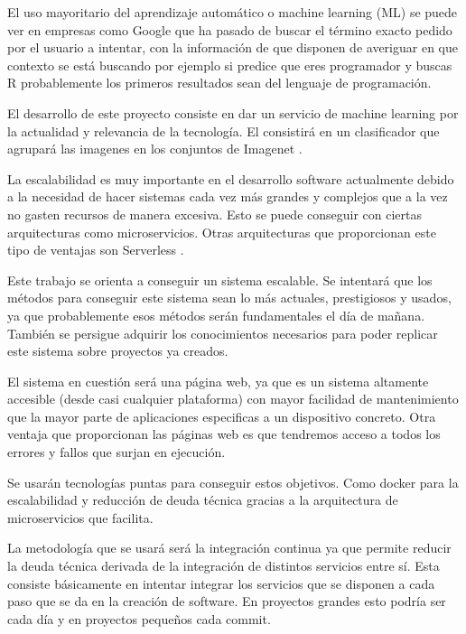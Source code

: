 

El uso mayoritario del aprendizaje automático o machine learning (ML) se puede ver en empresas como Google que ha pasado de buscar el término exacto pedido por el usuario a intentar, con la información de que disponen de averiguar en que contexto se está buscando por ejemplo si predice que eres programador y buscas R probablemente los primeros resultados sean del lenguaje de programación.

El desarrollo de este proyecto consiste en dar un servicio de machine learning por la actualidad y relevancia de la tecnología. El consistirá en un clasificador que agrupará las imagenes en los conjuntos de Imagenet \cite{imnet}.

La escalabilidad es muy importante en el desarrollo software actualmente debido a la necesidad de hacer sistemas cada vez más grandes y complejos que a la vez no gasten recursos de manera excesiva. Esto se puede conseguir con ciertas arquitecturas como microservicios. Otras arquitecturas que proporcionan este tipo de ventajas son Serverless \cite{svlops} \cite{svless}.

Este trabajo se orienta a conseguir un sistema escalable. Se intentará que los métodos para conseguir este sistema sean lo más actuales, prestigiosos y usados, ya que probablemente esos métodos serán fundamentales el día de mañana. También se persigue adquirir los conocimientos necesarios para poder replicar este sistema sobre proyectos ya creados.

El sistema en cuestión será una página web, ya que es un sistema altamente accesible (desde casi cualquier plataforma) con mayor facilidad de mantenimiento que la mayor parte de aplicaciones especificas a un dispositivo concreto. Otra ventaja que proporcionan las páginas web es que tendremos acceso a todos los errores y fallos que surjan en ejecución.

Se usarán tecnologías puntas para conseguir estos objetivos. Como docker para la escalabilidad y reducción de deuda técnica gracias a la arquitectura de microservicios que facilita.

La metodología que se usará será la integración continua ya que permite reducir la deuda técnica derivada de la integración de distintos servicios entre sí. Esta consiste básicamente en intentar integrar los servicios que se disponen a cada paso que se da en la creación de software. En proyectos grandes esto podría ser cada día y en proyectos pequeños cada commit.
